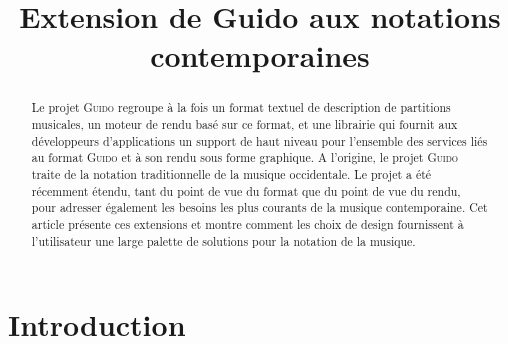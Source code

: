 \documentclass{article}
\title{\centering Extension de Guido aux notations contemporaines}
\newcommand{\guido}			{\textsc{Guido}}
\begin{document}

\maketitle

\begin{abstract}

Le projet \guido{} regroupe à la fois un format textuel de description de partitions musicales, un moteur de rendu basé sur ce format, et une librairie qui fournit aux développeurs d'applications un support de haut niveau pour l'ensemble des services liés au format \guido{} et à son rendu sous forme graphique. 
A l'origine, le projet \guido{} traite de la notation traditionnelle de la musique occidentale. Le projet a été récemment étendu, tant du point de vue du format que du point de vue du rendu, pour adresser également les besoins les plus courants de la musique contemporaine. Cet article présente ces extensions et montre comment les choix de design fournissent à l'utilisateur une large palette de solutions pour la notation de la musique. 


\end{abstract}


\section{Introduction}\label{sec:introduction}

% 
\end{document}
